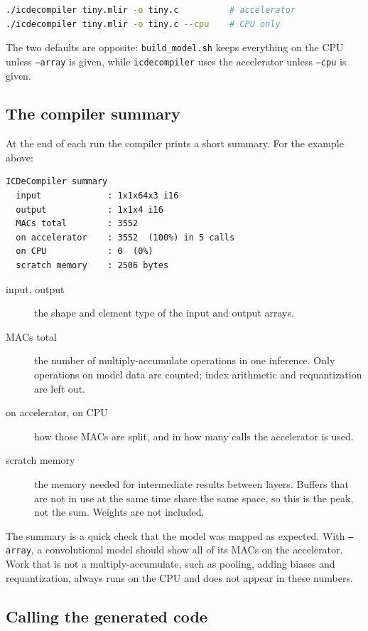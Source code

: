 \documentclass[11pt,a4paper]{article}
\begin{document}
\begin{lstlisting}[language=bash]
./icdecompiler tiny.mlir -o tiny.c          # accelerator
./icdecompiler tiny.mlir -o tiny.c --cpu    # CPU only
\end{lstlisting}

The two defaults are opposite: \texttt{build\_model.sh} keeps everything on
the CPU unless \texttt{--array} is given, while \texttt{icdecompiler} uses the
accelerator unless \texttt{--cpu} is given.

\subsection{The compiler summary}

At the end of each run the compiler prints a short summary. For the example
above:

\begin{lstlisting}
ICDeCompiler summary
  input             : 1x1x64x3 i16
  output            : 1x1x4 i16
  MACs total        : 3552
  on accelerator    : 3552  (100%) in 5 calls
  on CPU            : 0  (0%)
  scratch memory    : 2506 bytes
\end{lstlisting}

\begin{description}
  \item[input, output] the shape and element type of the input and output
    arrays.
  \item[MACs total] the number of multiply-accumulate operations in one
    inference. Only operations on model data are counted; index arithmetic and
    requantization are left out.
  \item[on accelerator, on CPU] how those MACs are split, and in how many
    calls the accelerator is used.
  \item[scratch memory] the memory needed for intermediate results between
    layers. Buffers that are not in use at the same time share the same
    space, so this is the peak, not the sum. Weights are not included.
\end{description}

The summary is a quick check that the model was mapped as expected. With
\texttt{--array}, a convolutional model should show all of its MACs on the
accelerator. Work that is not a multiply-accumulate, such as pooling, adding
biases and requantization, always runs on the CPU and does not appear in
these numbers.

\subsection{Calling the generated code}
\end{document}
